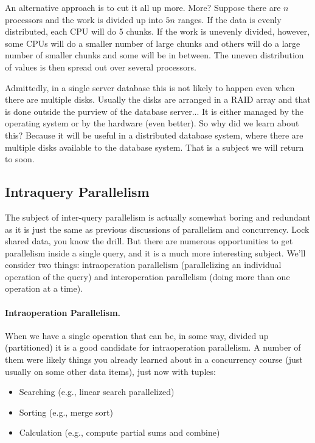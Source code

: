 An alternative approach is to cut it all up more. More? Suppose there are $n$ processors and the work is divided up into $5n$ ranges. If the data is evenly distributed, each CPU will do 5 chunks. If the work is unevenly divided, however, some CPUs will do a smaller number of large chunks and others will do a large number of smaller chunks and some will be in between. The uneven distribution of values is then spread out over several processors. 

Admittedly, in a single server database this is not likely to happen even when there are multiple disks. Usually the disks are arranged in a RAID array and that is done outside the purview of the database server... It is either managed by the operating system or by the hardware (even better). So why did we learn about this? Because it will be useful in a distributed database system, where there are multiple disks available to the database system. That is a subject we will return to soon.

\subsection*{Intraquery Parallelism}

The subject of inter-query parallelism is actually somewhat boring and redundant as it is just the same as previous discussions of parallelism and concurrency. Lock shared data, you know the drill. But there are numerous opportunities to get parallelism inside a single query, and it is a much more interesting subject. We'll consider two things: intraoperation parallelism (parallelizing an individual operation of the query) and interoperation parallelism (doing more than one operation at a time). 

\paragraph{Intraoperation Parallelism.} 
When we have a single operation that can be, in some way, divided up (partitioned) it is a good candidate for intraoperation parallelism. A number of them were likely things you already learned about in a concurrency course (just usually on some other data items), just now with tuples:

\begin{itemize}
	\item Searching (e.g., linear search parallelized)
	\item Sorting (e.g., merge sort)
	\item Calculation (e.g., compute partial sums and combine)
\end{itemize}

